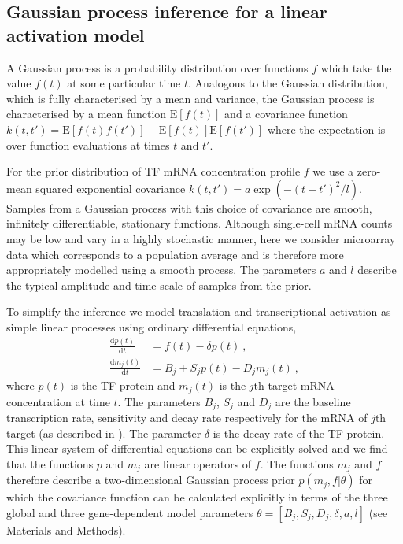 \documentclass{pnastwo}
\begin{document}
\begin{article}
\section{Gaussian process inference for a linear activation model}

A Gaussian process is a probability distribution over
functions $f$ which take the value $f(t)$ at some particular time
$t$. Analogous to the Gaussian distribution, which is fully characterised by a mean and variance, the Gaussian process is
characterised by a mean function $\mathrm{E}[f(t)]$ and a covariance
function $k(t,t')=\mathrm{E}[f(t)f(t')]-\mathrm{E}[f(t)]\mathrm{E}[f(t')]$
where the expectation is over function evaluations at times $t$ and
$t'$. 

For the prior distribution of TF mRNA concentration profile $f$ we use a zero-mean squared exponential covariance
$k(t,t')=a\exp(-(t-t')^2/l)$. Samples from a Gaussian process with this choice
of covariance are smooth, infinitely differentiable, stationary functions. Although single-cell mRNA counts may be low
and vary in a highly stochastic manner, here we consider microarray data which
corresponds to a population average and is therefore more
appropriately modelled using a smooth process. The parameters $a$ and
$l$ describe the typical amplitude and time-scale of samples from
the prior. 

To simplify the inference we model translation and transcriptional
activation as simple linear processes using ordinary differential
equations,
\begin{align}
  \frac{\mathrm{d}p(t)}{\mathrm{d}t} & = f(t) - \delta
  p(t) \ , \label{eq:translation_ode} \\
  \frac{\mathrm{d}m_j(t)}{\mathrm{d}t} & = B_j+S_j p(t)-D_j m_j(t) \ , \label{eq:transcription_ode}
\end{align}
where $p(t)$ is the TF protein and $m_j(t)$ is the $j$th target mRNA
concentration at time $t$. The parameters $B_j$, $S_j$ and $D_j$ are the
baseline transcription rate, sensitivity and decay rate respectively
for the mRNA of $j$th target (as described in \cite{Barenco2006a}).
The parameter $\delta$ is the decay rate of the TF protein.
This linear system of differential equations can be
explicitly solved and we find that the functions $p$ and $m_j$ are
linear operators of $f$. The functions $m_j$ and $f$ therefore
describe a two-dimensional Gaussian process prior $p(m_j,f|\theta)$
for which the covariance function can be calculated explicitly in terms of the
three global and three gene-dependent model parameters
$\theta=[B_j,S_j,D_j,\delta,a,l]$ (see
Materials and Methods). 


\end{article}
\end{document}
